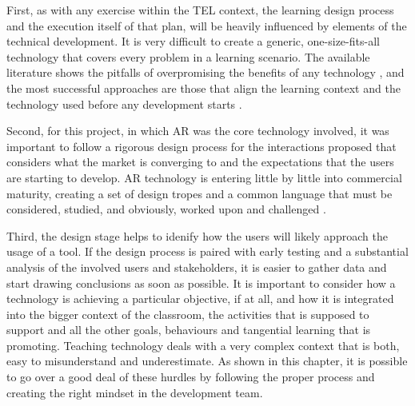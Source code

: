 First, as with any exercise within the \ac{TEL} context, the learning design process and the execution itself of that plan, will be heavily influenced by elements of the technical
development. It is very difficult to create a generic, one-size-fits-all technology that covers every problem in a learning scenario. The available literature shows the pitfalls of
overpromising the benefits of any technology \parencite{wang_2003}, and the most successful approaches are those that align the learning context and the technology used before any
development starts \parencite{barr_1990}.

Second, for this project, in which \ac{AR} was the core technology involved, it was important to follow a rigorous design process for the interactions proposed that considers what the
market is converging to and the expectations that the users are starting to develop. \ac{AR} technology is entering little by little into commercial maturity, creating a set of design
tropes and a common language that must be considered, studied, and obviously, worked upon and challenged \parencite{liu_2022}.

Third, the design stage helps to idenify how the users will likely approach the usage of a tool. If the design process is paired with early testing and a substantial analysis of the
involved users and stakeholders, it is easier to gather data and start drawing conclusions as soon as possible. It is important to consider how a technology is achieving a particular
objective, if at all, and how it is integrated into the bigger context of the classroom, the activities that is supposed to support and all the other goals, behaviours and tangential
learning that is promoting. Teaching technology deals with a very complex context that is both, easy to misunderstand and underestimate. As shown in this chapter, it is possible to go
over a good deal of these hurdles by following the proper process and creating the right mindset in the development team.